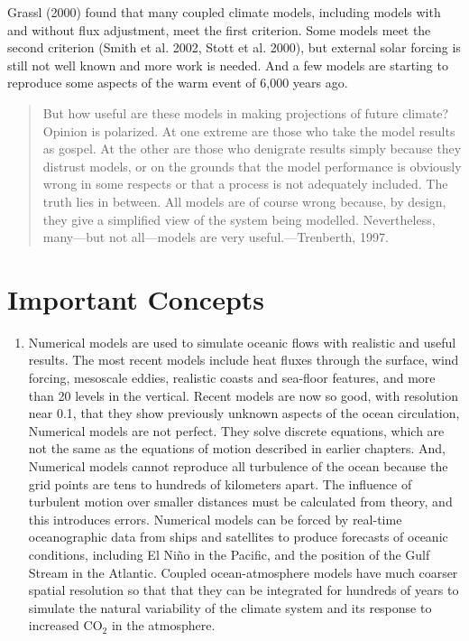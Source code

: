 Grassl (2000) found that many coupled climate models, including models with and
without flux adjustment, meet the first criterion. Some models meet the second
criterion (Smith et al. 2002, Stott et al. 2000), but external solar forcing is still not well known and more work
is needed. And a few models are starting to reproduce some aspects of the warm event
of 6,000 years ago.
\begin{quote} \small
But how useful are these models in making projections of future climate? Opinion
is polarized. At one extreme are those who take the model results as gospel. At
the other are those who denigrate results simply because they distrust models, or
on the grounds that the model performance is obviously wrong in some respects or
that a process is not adequately included. The truth lies in between. All models
are of course wrong because, by design, they give a simplified view of the
system being modelled. Nevertheless, many---but not all---models are very
useful.---Trenberth, 1997.
\end{quote}

\section{Important Concepts}
\begin{enumerate}
\item
Numerical models are used to simulate oceanic flows with realistic and useful
results. The most recent models include heat fluxes through the surface, wind
forcing, mesoscale eddies, realistic coasts and sea-floor features,
and more than 20 levels in the vertical.
\vitem
Recent models are now so good, with resolution near 0.1\degrees, that they show previously
unknown aspects of the ocean circulation,
\vitem
Numerical models are not perfect. They solve discrete equations, which
are not the same as the equations of motion described in earlier chapters. And,
\vitem
Numerical models cannot reproduce all turbulence of the ocean because
the grid points are tens to hundreds of kilometers apart. The influence of turbulent motion
over smaller distances must be calculated from theory, and this introduces errors.
\vitem
Numerical models can be forced by real-time oceanographic data from ships
and satellites to produce forecasts of oceanic conditions, including El Ni\~{n}o
in the Pacific, and  the position of the Gulf Stream in the
Atlantic.
\vitem
Coupled ocean-atmosphere models have much coarser spatial resolution so that that
they can be integrated for hundreds of years to simulate the natural variability
of the climate system and its response to increased CO$_2$ in the atmosphere.
\end{enumerate}


